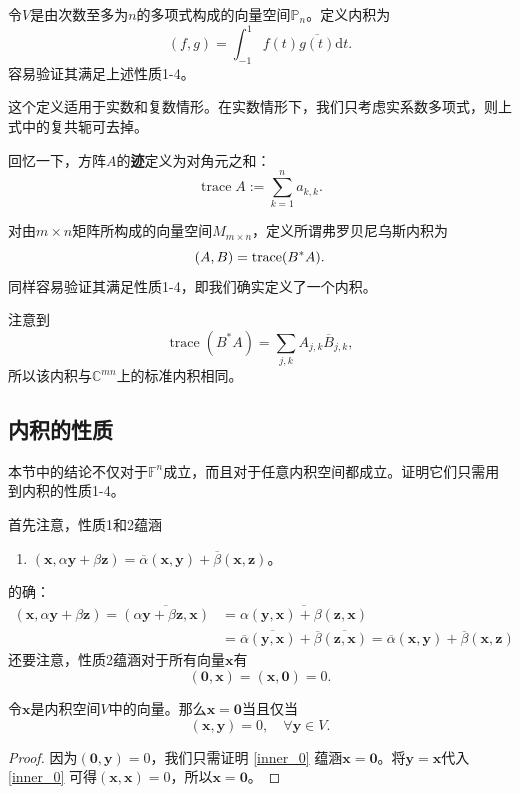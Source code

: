 \begin{example}
    令$V$是由次数至多为$n$的多项式构成的向量空间$\mathbb{P}_n$。定义内积为
    \[(f,g)=\int_{-1}^{1}f(t)\overline{g(t)}\mathrm{d}t.\]
    容易验证其满足上述性质1-4。

    这个定义适用于实数和复数情形。在实数情形下，我们只考虑实系数多项式，则上式中的复共轭可去掉。
\end{example}

回忆一下，方阵$A$的\textbf{迹}定义为对角元之和：\[\operatorname{trace}A:=\sum_{k=1}^{n}a_{k,k}.\]

\begin{example}
    对由$m\times n$矩阵所构成的向量空间$M_{m\times n}$，定义所谓弗罗贝尼乌斯内积为\[(A,B)=\operatorname{trace} (B^\ast A).\]
    同样容易验证其满足性质1-4，即我们确实定义了一个内积。

    注意到\[\operatorname{trace}(B^*A)=\sum_{j,k}A_{j,k}\overline{B}_{j,k},\]
    所以该内积与$\mathbb{C}^{mn}$上的标准内积相同。
\end{example}

\subsection{内积的性质}

本节中的结论不仅对于$\mathbb{F}^n$成立，而且对于任意内积空间都成立。证明它们只需用到内积的性质1-4。

首先注意，性质1和2蕴涵

\begin{enumerate}
    \item[2$^\prime$.] $(\mathbf{x},\alpha\mathbf{y}+\beta\mathbf{z})=\overline{\alpha}(\mathbf{x},\mathbf{y})+\overline{\beta}(\mathbf{x},\mathbf{z})$。
\end{enumerate}
的确：
\[\begin{aligned}
    (\mathbf{x},\alpha\mathbf{y}+\beta\mathbf{z})=\overline{(\alpha\mathbf{y}+\beta\mathbf{z},\mathbf{x})}&=\overline{\alpha(\mathbf{y},\mathbf{x})+\beta(\mathbf{z},\mathbf{x})}\\
    &=\overline{\alpha}\overline{(\mathbf{y},\mathbf{x})}+\overline{\beta}\overline{(\mathbf{z},\mathbf{x})}=\overline{\alpha}(\mathbf{x},\mathbf{y})+\overline{\beta}(\mathbf{x},\mathbf{z})
\end{aligned}\]
还要注意，性质2蕴涵对于所有向量$\mathbf{x}$有\[(\mathbf{0},\mathbf{x})=(\mathbf{x},\mathbf{0})=0.\]
\begin{lemma}\label{lem:x_0_inner_0}
    令$\mathbf{x}$是内积空间$V$中的向量。那么$\mathbf{x}=\mathbf{0}$当且仅当
    \begin{equation}\label{inner_0}
        (\mathbf{x},\mathbf{y})=0,\quad \forall \mathbf{y}\in V.
    \end{equation}
\end{lemma}
\begin{proof}
    因为$(\mathbf{0},\mathbf{y})=0$，我们只需证明 \eqref{inner_0} 蕴涵$\mathbf{x}=\mathbf{0}$。将$\mathbf{y}=\mathbf{x}$代入 \eqref{inner_0} 可得$(\mathbf{x},\mathbf{x})=0$，所以$\mathbf{x}=\mathbf{0}$。
\end{proof}

